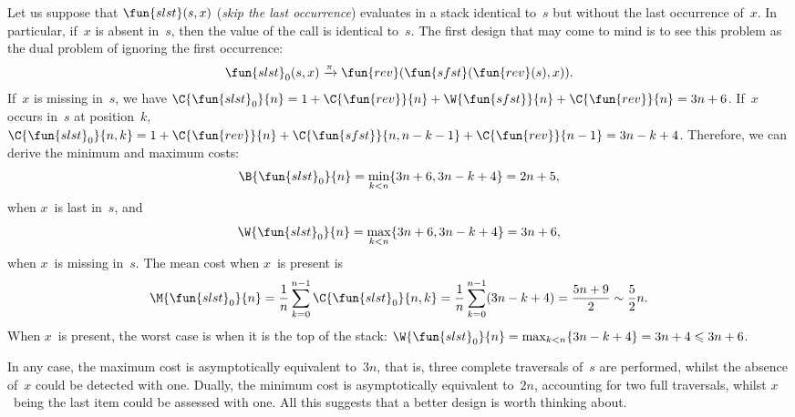 Let us suppose that \(\fun{slst}(s,x)\)
(\emph{skip the last occurrence}) evaluates in a stack identical
to~\(s\) but without the last occurrence of~\(x\). In particular,
if~\(x\) is absent in~\(s\), then the value of the call is identical
to~\(s\). The first design that may come to mind is to see this
problem as the dual problem of ignoring the first occurrence:
\begin{equation}
\fun{slst}_0(s,x) \xrightarrow{\smash{\pi}}
                  \fun{rev}(\fun{sfst}(\fun{rev}(s),x)).
\label{eq:slst0}
\end{equation}
If~\(x\) is missing in~\(s\), we
have
\(\C{\fun{slst}_0}{n} = 1 + \C{\fun{rev}}{n} + \W{\fun{sfst}}{n} +
\C{\fun{rev}}{n} = 3n+6\). If~\(x\) occurs in~\(s\) at position~\(k\),
\(\C{\fun{slst}_0}{n,k} = 1 + \C{\fun{rev}}{n} +
\C{\fun{sfst}}{n,n-k-1} + \C{\fun{rev}}{n-1} = 3n - k +
4\). Therefore, we can derive the minimum and
maximum costs:
\begin{equation*}
\abovedisplayskip=0pt
\belowdisplayskip=0pt
\B{\fun{slst}_0}{n} = \min_{k < n}\{3n+6,3n-k+4\} = 2n + 5,
\end{equation*}
when \(x\)~is last in~\(s\), and
\begin{equation*}
\abovedisplayskip=0pt
\belowdisplayskip=0pt
\W{\fun{slst}_0}{n} = \max_{k < n}\{3n+6,3n-k+4\} = 3n+6,
\end{equation*}
when \(x\)~is missing in~\(s\).  The
mean cost when \(x\)~is present is
\begin{equation*}
\abovedisplayskip=0pt
\belowdisplayskip=0pt
\M{\fun{slst}_0}{n} = \frac{1}{n}\sum_{k=0}^{n-1}\C{\fun{slst}_0}{n,k}
                    = \frac{1}{n}\sum_{k=0}^{n-1}(3n - k + 4)
                    = \frac{5n+9}{2} \sim \frac{5}{2}n.
\end{equation*}
When \(x\)~is present, the worst case is when it is the top of the
stack: \(\W{\fun{slst}_0}{n} = \max_{k<n}\{3n - k + 4\} = 3 n+ 4
\leqslant 3n + 6\).

In any case, the maximum cost is asymptotically equivalent to~\(3n\),
that is, three complete traversals of~\(s\) are performed, whilst the
absence of~\(x\) could be detected with one. Dually, the minimum cost
is asymptotically equivalent to~\(2n\), accounting for two full
traversals, whilst \(x\)~being the last item could be assessed with
one. All this suggests that a better design is worth thinking about.

